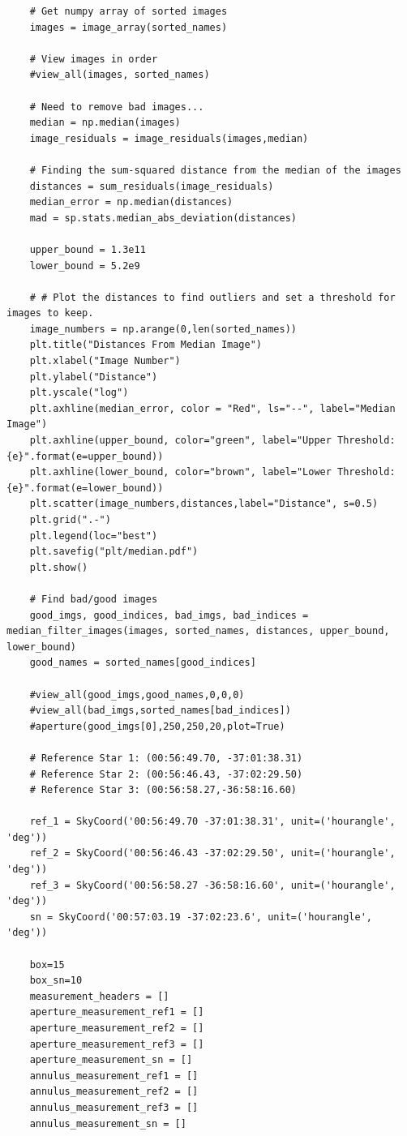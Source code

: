 \documentclass{article}
\begin{document}
\begin{appendices}
\begin{verbatim}
    # Get numpy array of sorted images
    images = image_array(sorted_names)
    
    # View images in order 
    #view_all(images, sorted_names)
    
    # Need to remove bad images...
    median = np.median(images)
    image_residuals = image_residuals(images,median)
    
    # Finding the sum-squared distance from the median of the images
    distances = sum_residuals(image_residuals)
    median_error = np.median(distances)
    mad = sp.stats.median_abs_deviation(distances)
    
    upper_bound = 1.3e11
    lower_bound = 5.2e9
    
    # # Plot the distances to find outliers and set a threshold for images to keep. 
    image_numbers = np.arange(0,len(sorted_names))
    plt.title("Distances From Median Image")
    plt.xlabel("Image Number")
    plt.ylabel("Distance")
    plt.yscale("log")
    plt.axhline(median_error, color = "Red", ls="--", label="Median Image")
    plt.axhline(upper_bound, color="green", label="Upper Threshold: {e}".format(e=upper_bound))
    plt.axhline(lower_bound, color="brown", label="Lower Threshold: {e}".format(e=lower_bound))
    plt.scatter(image_numbers,distances,label="Distance", s=0.5)
    plt.grid(".-")
    plt.legend(loc="best")
    plt.savefig("plt/median.pdf")
    plt.show()
    
    # Find bad/good images 
    good_imgs, good_indices, bad_imgs, bad_indices = median_filter_images(images, sorted_names, distances, upper_bound, lower_bound)
    good_names = sorted_names[good_indices]
    
    #view_all(good_imgs,good_names,0,0,0)
    #view_all(bad_imgs,sorted_names[bad_indices])
    #aperture(good_imgs[0],250,250,20,plot=True)
    
    # Reference Star 1: (00:56:49.70, -37:01:38.31)
    # Reference Star 2: (00:56:46.43, -37:02:29.50)
    # Reference Star 3: (00:56:58.27,-36:58:16.60)
    
    ref_1 = SkyCoord('00:56:49.70 -37:01:38.31', unit=('hourangle', 'deg'))
    ref_2 = SkyCoord('00:56:46.43 -37:02:29.50', unit=('hourangle', 'deg'))
    ref_3 = SkyCoord('00:56:58.27 -36:58:16.60', unit=('hourangle', 'deg'))
    sn = SkyCoord('00:57:03.19 -37:02:23.6', unit=('hourangle', 'deg'))
    
    box=15
    box_sn=10
    measurement_headers = []
    aperture_measurement_ref1 = []
    aperture_measurement_ref2 = []
    aperture_measurement_ref3 = []
    aperture_measurement_sn = []
    annulus_measurement_ref1 = []
    annulus_measurement_ref2 = []
    annulus_measurement_ref3 = []
    annulus_measurement_sn = []
    

\end{verbatim}
\end{appendices}
\end{document}
